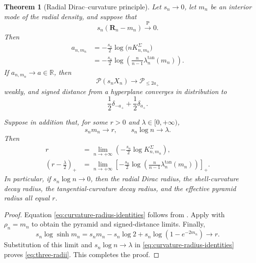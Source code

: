 \documentclass{amsart}
\numberwithin{equation}{section}
\theoremstyle{plain}
\newtheorem{thm}{Theorem}[section]
\theoremstyle{definition}
\theoremstyle{remark}
\newcommand{\R}{\mathbb{R}}
\newcommand{\Pyr}{\mathcal{P}}
\begin{document}
\begin{thm}[Radial Dirac--curvature principle]
\label{thm:dirac-curvature-principle}
	Let $s_n\to0$, let $m_n$ be an interior mode of the radial density, and
	suppose that
	\begin{equation}\label{eq:modal-dirac}
		s_n(\mathbf R_n-m_n)\overset{\mathrm P}{\longrightarrow}0.
	\end{equation}
	Then
	\begin{equation}\label{eq:curvature-radius-identities}
		\begin{aligned}
a_{n,m_n} &=-\frac{s_n}{2}\log\bigl(nK_{n,m_n}^{\Sigma}\bigr)\\
&=-\frac{s_n}{2}\log\left( \frac n{n-1}\lambda_n^{\mathrm{tan}}(m_n) \right).
		\end{aligned}
	\end{equation}
	If $a_{n,m_n}\to a\in\R$, then
	\[
		\Pyr(s_nX_n)\longrightarrow\mathcal P_{\le2a_+}
	\]
	weakly, and signed distance from a hyperplane converges in distribution
	to
	\[
		\frac12\delta_{-a_+}+\frac12\delta_{a_+}.
	\]

	Suppose in addition that, for some $r>0$ and
	$\lambda\in[0,+\infty)$,
	\begin{equation}\label{eq:raw-modal-radius}
		s_nm_n\longrightarrow r,
		\qquad
		s_n\log n\longrightarrow\lambda.
	\end{equation}
	Then
	\begin{equation}\label{eq:three-radii}
		\begin{aligned}
r &= \lim_{n\to+\infty} \left(-\frac{s_n}{2}\log K_{n,m_n}^{\Sigma}\right),\\
		\left(r-\frac\lambda2\right)_+
		&=
		\lim_{n\to+\infty}
		\left[
		-\frac{s_n}{2}\log\left(
		\frac n{n-1}\lambda_n^{\mathrm{tan}}(m_n)
		\right)\right]_+.
		\end{aligned}
	\end{equation}
	In particular, if $s_n\log n\to0$, then the radial Dirac radius, the
	shell-curvature decay radius, the tangential-curvature decay radius, and
	the effective pyramid radius all equal $r$.
\end{thm}

\begin{proof}
	Equation \eqref{eq:curvature-radius-identities} follows from
	.  Apply 
	with $\rho_n=m_n$ to obtain the pyramid and signed-distance limits.
	Finally,
\[ s_n\log\sinh m_n = s_nm_n-s_n\log2+s_n\log(1-e^{-2m_n}) \longrightarrow r. \]
	Substitution of this limit and $s_n\log n\to\lambda$ in
	\eqref{eq:curvature-radius-identities} proves
	\eqref{eq:three-radii}.  This completes the proof.
\end{proof}
\end{document}

